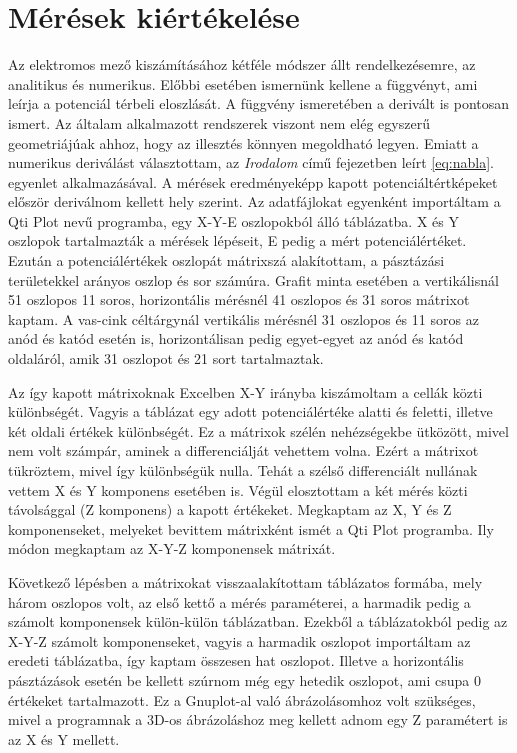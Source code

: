 \section{Mérések kiértékelése}

Az elektromos mező kiszámításához kétféle módszer állt rendelkezésemre, az analitikus és numerikus. Előbbi esetében ismernünk kellene a függvényt, ami leírja a potenciál térbeli eloszlását. A függvény ismeretében a derivált is pontosan ismert. Az általam alkalmazott rendszerek viszont nem elég egyszerű geometriájúak ahhoz, hogy az illesztés könnyen megoldható legyen. Emiatt a numerikus deriválást választottam, az \emph{Irodalom} című fejezetben leírt \ref{eq:nabla}. egyenlet alkalmazásával. A mérések eredményeképp kapott potenciáltértképeket először deriválnom kellett hely szerint. Az adatfájlokat egyenként importáltam a Qti Plot nevű programba, egy X-Y-E oszlopokból álló táblázatba. X és Y oszlopok tartalmazták a mérések lépéseit, E pedig a mért potenciálértéket. Ezután a potenciálértékek oszlopát mátrixszá alakítottam, a pásztázási területekkel arányos oszlop és sor számúra. Grafit minta esetében a vertikálisnál 51 oszlopos 11 soros, horizontális mérésnél 41 oszlopos és 31 soros mátrixot kaptam. A vas-cink céltárgynál vertikális mérésnél 31 oszlopos és 11 soros az anód és katód esetén is, horizontálisan pedig egyet-egyet az anód és katód oldaláról, amik 31 oszlopot és 21 sort tartalmaztak. 

Az így kapott mátrixoknak Excelben X-Y irányba kiszámoltam a cellák közti különbségét. Vagyis a táblázat egy adott potenciálértéke alatti és feletti, illetve két oldali értékek különbségét. Ez a mátrixok szélén nehézségekbe ütközött, mivel nem volt számpár, aminek a differenciálját vehettem volna. Ezért a mátrixot tükröztem, mivel így különbségük nulla. Tehát a szélső differenciált nullának vettem X és Y komponens esetében is. Végül elosztottam a két mérés közti távolsággal (Z komponens) a kapott értékeket. Megkaptam az X, Y és Z komponenseket, melyeket bevittem mátrixként ismét a Qti Plot programba. Ily módon megkaptam az X-Y-Z komponensek mátrixát.

Következő lépésben a mátrixokat visszaalakítottam táblázatos formába, mely három oszlopos volt, az első kettő a mérés paraméterei, a harmadik pedig a számolt komponensek külön-külön táblázatban. Ezekből a táblázatokból pedig az X-Y-Z számolt komponenseket, vagyis a harmadik oszlopot importáltam az eredeti táblázatba, így kaptam összesen hat oszlopot. Illetve a horizontális pásztázások esetén be kellett szúrnom még egy hetedik oszlopot, ami csupa 0 értékeket tartalmazott. Ez a Gnuplot-al való ábrázolásomhoz volt szükséges, mivel a programnak a 3D-os ábrázoláshoz meg kellett adnom egy Z paramétert is az X és Y mellett. 

